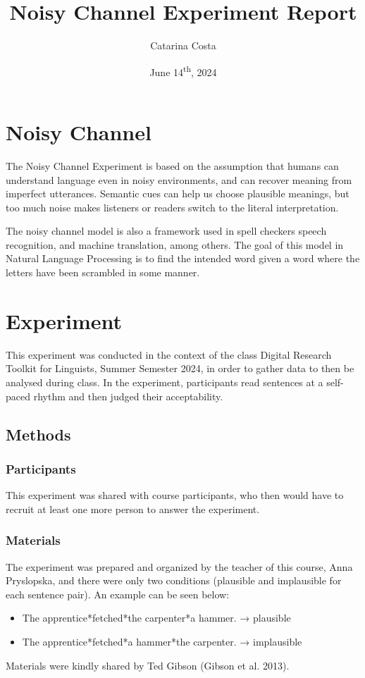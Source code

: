 \documentclass{article}
\title{Noisy Channel Experiment Report}
\author{Catarina Costa}
\date{June 14\textsuperscript{th}, 2024}
\begin{document}
\maketitle
\section{Noisy Channel}

The Noisy Channel Experiment is based on the assumption that humans can understand language even in noisy environments, and can recover meaning from imperfect utterances. Semantic cues can help us choose plausible meanings, but too much noise makes listeners or readers switch to the literal interpretation.

The noisy channel model is also a framework used in spell checkers speech recognition, and machine translation, among others. The goal of this model in Natural Language Processing is to find the intended word given a word where the letters have been scrambled in some manner.

\section{Experiment}
This experiment was conducted in the context of the class Digital Research Toolkit for Linguists, Summer Semester 2024, in order to gather data to then be analysed during class. In the experiment, participants read sentences at a self-paced rhythm and then judged their acceptability.
\subsection{Methods}
\subsubsection{Participants}
This experiment was shared with course participants, who then would have to recruit at least one more person to answer the experiment.
\subsubsection{Materials}
The experiment was prepared and organized by the teacher of this course, Anna Pryslopska, and there were only two conditions (plausible and implausible for each sentence pair). An example can be seen below: 
\begin{itemize}
    \item The apprentice*fetched*the carpenter*a hammer. → plausible
    \item The apprentice*fetched*a hammer*the carpenter. → implausible
\end{itemize}
Materials were kindly shared by Ted Gibson (Gibson et al. 2013).
\end{document}
